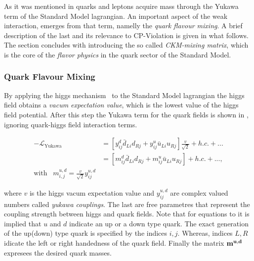 As it was mentioned in  quarks and leptons acquire mass through the Yukawa term
of the Standard Model lagrangian. An important aspect of the weak interaction, emerges from that term,
namelly the {\it quark flavour mixing}. A brief description of the last and its relevance to CP-Violation is given in what follows.
The section concludes with introducing the so called {\it CKM-mixing matrix}, which is the core of the
{\it flavor physics} in the quark sector of the Standard Model.

\subsubsection{Quark Flavour Mixing}
By applying the higgs mechanism~\cite{PhysRevLett.13.321,PhysRevLett.13.508} to the Standard Model lagrangian the higgs field obtains a
{\it vacum expectation value}, which is the lowest value of the higgs field potential.
After this step the Yukawa term for the quark fields is shown in ,
 ignoring quark-higgs field interaction terms.

\begin{subequations}
\label{yukawa_flavour}
  \begin{align}
  -\mathscr{L}_{\text{Yukawa}} &= \left[ y_{ij}^d \bar{d}_{Li} d_{Rj} + y_{ij}^u \bar{u}_{Li} u_{Rj} \right] \frac{v}{\sqrt{2}} + h.c. + ...  \\
                               &= \left[ m_{ij}^d \bar{d}_{Li} d_{Rj} + m_{ij}^u \bar{u}_{Li} u_{Rj} \right] + h.c. + ...,  \\
                               \text{with} \;\;\; m^{u,d}_{i,j} = \frac{v}{\sqrt{2}} y_{ij}^{u,d} & \nonumber
  \end{align}
\end{subequations}

\noindent where $v$ is the higgs vacum expectation value and $y_{ij}^{u,d}$ are complex valued numbers called {\it yukawa couplings}.
The last are free parametres that represent the coupling strength between higgs and quark fields.
Note that for equations  to  it is implied that $u$ and $d$ indicate
an up or a down type quark. The exact generation of the up(down) type quark is specified by the indices $i,j$.
Whereas, indices $L,R\;$ idicate the left or right handedness of the quark field.
Finally the matrix $\bf m^{u,d}$ expresees the desired quark masses.

